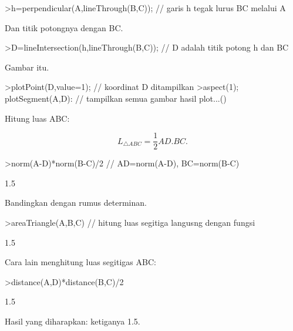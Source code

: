 \documentclass[a4paper,10pt]{article}
\begin{document}
\begin{eulernotebook}
\begin{eulercomment}
\begin{eulercomment}
\begin{eulercomment}
\begin{eulercomment}
\begin{eulercomment}
\end{eulercomment}
\begin{eulerprompt}
>h=perpendicular(A,lineThrough(B,C)); // garis h tegak lurus BC melalui A
\end{eulerprompt}
\begin{eulercomment}
Dan titik potongnya dengan BC.
\end{eulercomment}
\begin{eulerprompt}
>D=lineIntersection(h,lineThrough(B,C)); // D adalah titik potong h dan BC
\end{eulerprompt}
\begin{eulercomment}
Gambar itu.
\end{eulercomment}
\begin{eulerprompt}
>plotPoint(D,value=1); // koordinat D ditampilkan
>aspect(1); plotSegment(A,D): // tampilkan semua gambar hasil plot...()
\end{eulerprompt}
\begin{eulercomment}
Hitung luas ABC:

\end{eulercomment}
\begin{eulerformula}
\[
L_{\triangle ABC}= \frac{1}{2}AD.BC.
\]
\end{eulerformula}
\begin{eulerprompt}
>norm(A-D)*norm(B-C)/2 // AD=norm(A-D), BC=norm(B-C)
\end{eulerprompt}
\begin{euleroutput}
  1.5
\end{euleroutput}
\begin{eulercomment}
Bandingkan dengan rumus determinan.
\end{eulercomment}
\begin{eulerprompt}
>areaTriangle(A,B,C) // hitung luas segitiga langusng dengan fungsi
\end{eulerprompt}
\begin{euleroutput}
  1.5
\end{euleroutput}
\begin{eulercomment}
Cara lain menghitung luas segitigas ABC:
\end{eulercomment}
\begin{eulerprompt}
>distance(A,D)*distance(B,C)/2
\end{eulerprompt}
\begin{euleroutput}
  1.5
\end{euleroutput}
\begin{eulercomment}
Hasil yang diharapkan: ketiganya 1.5.


\end{eulercomment}
\end{eulercomment}
\end{eulercomment}
\end{eulercomment}
\end{eulercomment}
\end{eulernotebook}
\end{document}
